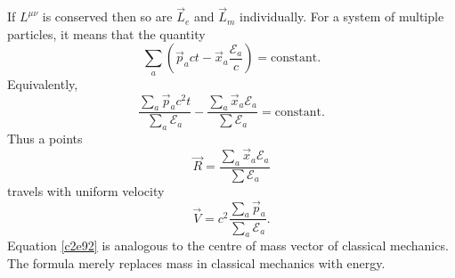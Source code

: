 \begin{enumerate}
If $L^{\mu\nu}$ is conserved then so are $\vec{L}_e$ and $\vec{L}_m$ individually.
For a system of multiple particles, it means that the quantity
\begin{equation}\label{c2e90}
\sum_a \left(\vec{p}_act - \vec{x}_a\frac{\mathcal{E}_a}{c}\right) = \text{constant.}
\end{equation}
Equivalently,
\begin{equation}\label{c2e91}
\frac{\sum_a\vec{p}_ac^2t}{\sum_a \mathcal{E}_a} - \frac{\sum_a\vec{x}_a \mathcal{E}_a}{\sum \mathcal{E}_a} = \text{constant.}
\end{equation}
Thus a points
\begin{equation}\label{c2e92}
\vec{R} = \frac{\sum_a\vec{x}_a \mathcal{E}_a}{\sum \mathcal{E}_a}
\end{equation}
travels with uniform velocity
\begin{equation}\label{c2e93}
\vec{V} = c^2\frac{\sum_a\vec{p}_a}{\sum_a \mathcal{E}_a}.
\end{equation}
Equation \eqref{c2e92} is analogous to the centre of mass vector of classical 
mechanics. The formula merely replaces mass in classical mechanics with energy.
\end{enumerate}

